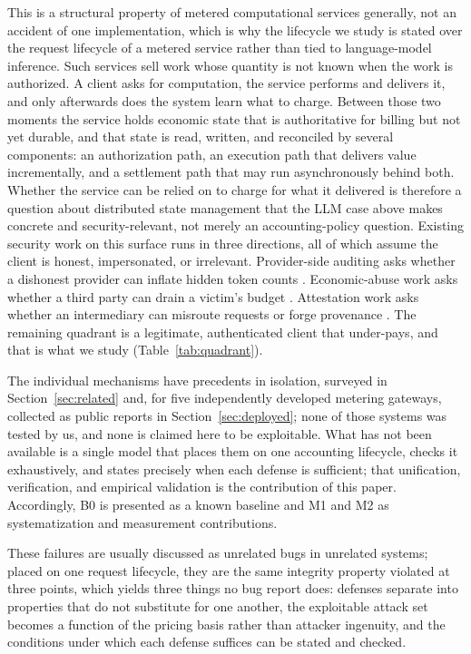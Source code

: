 \documentclass[manuscript,review]{acmart}
\begin{document}
This is a structural property of metered computational services generally, not an
accident of one implementation, which is why the lifecycle we study is stated over the
request lifecycle of a metered service rather than tied to language-model inference.
Such services sell work whose quantity is not known when the work is
authorized. A client asks for computation, the service performs and delivers it, and only
afterwards does the system learn what to charge. Between those two moments the service
holds economic state that is authoritative for billing but not yet durable, and that
state is read, written, and reconciled by several components: an authorization path, an
execution path that delivers value incrementally, and a settlement path that may run
asynchronously behind both. Whether the service can be relied on to charge for what it
delivered is therefore a question about distributed state management that the LLM case
above makes concrete and security-relevant, not merely an accounting-policy question.
Existing security
work on this surface runs in three directions, all of which assume the client is honest,
impersonated, or irrelevant. Provider-side auditing asks whether a dishonest provider can
inflate hidden token counts \citep{coin,invisible,tokeninflation,ptia,auditingpaypertoken}. Economic-abuse work asks
whether a third party can drain a victim's budget \citep{dow,dowreview,owasp,llmjacking}.
Attestation work asks whether an intermediary can misroute requests or forge provenance
\citep{aex,gwprov}. The remaining quadrant is a legitimate, authenticated client that
under-pays, and that is what we study (Table~\ref{tab:quadrant}).

The individual mechanisms have precedents in isolation, surveyed in
Section~\ref{sec:related} and, for five independently developed metering gateways,
collected as public reports in Section~\ref{sec:deployed}; none of those systems was
tested by us, and none is claimed here to be exploitable. What has not been available is a
single model that places them on one accounting lifecycle, checks it exhaustively, and
states precisely when each defense is sufficient; that unification, verification, and
empirical validation is the contribution of this paper. Accordingly, B0 is presented as a
known baseline and M1 and M2 as systematization and measurement contributions.

These failures are usually discussed as unrelated bugs in unrelated systems; placed on one
request lifecycle, they are the same integrity property violated at three points, which
yields three things no bug report does: defenses separate into properties that do not
substitute for one another, the exploitable attack set becomes a function of the pricing
basis rather than attacker ingenuity, and the conditions under which each defense
suffices can be stated and checked.
\end{document}
